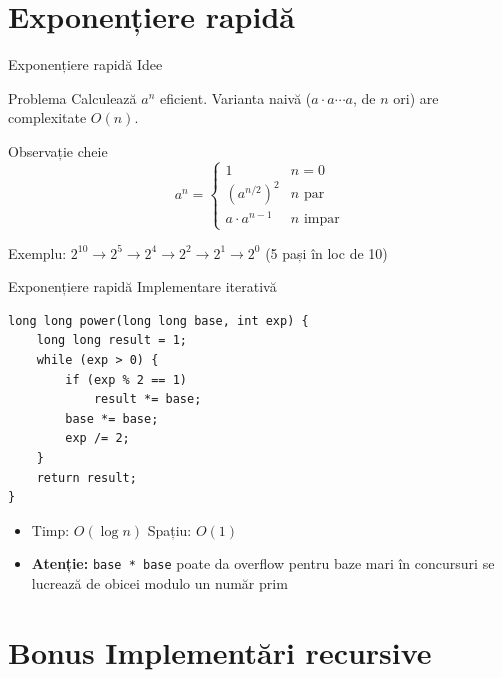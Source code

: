 ﻿\documentclass{beamer}
\begin{document}
\section{Exponențiere rapidă}

\begin{frame}{Exponențiere rapidă \textemdash{} Idee}
  \begin{block}{Problema}
    Calculează $a^n$ eficient. Varianta naivă ($a \cdot a \cdots a$, de $n$ ori) are complexitate $O(n)$.
  \end{block}
  \bigskip
  \begin{block}{Observație cheie}
    \[
      a^n = \begin{cases}
        1 & n = 0 \\
        \left(a^{n/2}\right)^2 & n \text{ par} \\
        a \cdot a^{n-1} & n \text{ impar}
      \end{cases}
    \]
  \end{block}
  \bigskip
  Exemplu: $2^{10} \rightarrow 2^5 \rightarrow 2^4 \rightarrow 2^2 \rightarrow 2^1 \rightarrow 2^0$ \quad (5 pași în loc de 10)
\end{frame}

\begin{frame}{Exponențiere rapidă \textemdash{} Implementare iterativă}
  \begin{center}
  \begin{lstlisting}
long long power(long long base, int exp) {
    long long result = 1;
    while (exp > 0) {
        if (exp % 2 == 1)
            result *= base;
        base *= base;
        exp /= 2;
    }
    return result;
}
  \end{lstlisting}
  \end{center}
  \begin{itemize}
    \item Timp: $O(\log n)$ \quad Spațiu: $O(1)$
    \item \textbf{Atenție:} \lstinline|base * base| poate da overflow pentru baze mari \textemdash{} în concursuri se lucrează de obicei modulo un număr prim
  \end{itemize}
\end{frame}

\section{Bonus \textemdash{} Implementări recursive}
\end{document}
